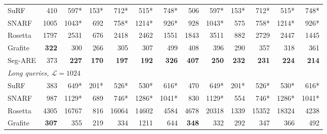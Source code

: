 \begin{table}[H]
\begin{tabular}{@{}lrrrrrr|rrrrrr@{}}
        \midrule
        SuRF    & 410          & 597*             & 153*             & 712*             & 515*             & 748*             & 506          & 597*             & 153*             & 712*             & 515*             & 748*             \\
        SNARF   & 1005         & 1043*            & 692              & 758*             & 1214*            & 926*             & 928          & 1043*            & 575              & 758*             & 1214*            & 926*             \\
        Rosetta & 1797         & 2531             & 676              & 2418             & 2462             & 1551             & 1843         & 3511             & 882              & 2729             & 2447             & 1445             \\
        Grafite & \textbf{322} & 300              & 266              & 305              & 307              & 499              & 408          & 396              & 290              & 357              & 318              & 361              \\
        Seg-ARE & 373          & \textbf{227}     & \textbf{170}     & \textbf{197}     & \textbf{192}     & \textbf{326}     & \textbf{407} & \textbf{250}     & \textbf{232}     & \textbf{231}     & \textbf{224}     & \textbf{214}     \\
        \midrule
        \multicolumn{13}{l}{\textit{Long queries, $\mathcal{L} = 1024$}} \\
        \midrule
        SuRF    & 383          & 649*             & 201*             & 526*             & 530*             & 616*             & 470          & 649*             & 201*             & 526*             & 530*             & 616*             \\
        SNARF   & 987          & 1129*            & 689              & 746*             & 1286*            & 1041*            & 830          & 1129*            & 554              & 746*             & 1286*            & 1041*            \\
        Rosetta & 4305         & 16767            & 816              & 16064            & 14602            & 4584             & 4678         & 20318            & 1339             & 15352            & 18324            & 4238             \\
        Grafite & \textbf{307} & 355              & 219              & 334              & 1211             & 644              & \textbf{348} & 332              & 292              & 347              & 366              & 492              \\

\end{tabular}
\end{table}
